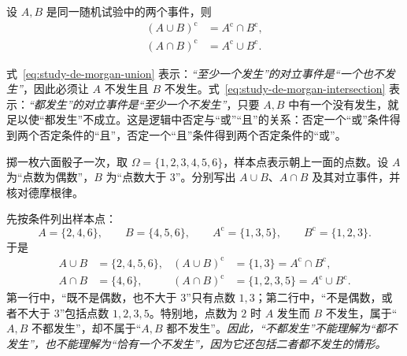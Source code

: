 \documentclass[UTF8,12pt,a4paper,fontset=fandol]{ctexbook}
\begin{document}
\begin{proposition}[两个事件的德摩根律]
\label{prop:study-de-morgan}
设 $A,B$ 是同一随机试验中的两个事件，则
\begin{align}
  (A\cup B)^{\mathrm c}
    &=A^{\mathrm c}\cap B^{\mathrm c},
    \label{eq:study-de-morgan-union}\\
  (A\cap B)^{\mathrm c}
    &=A^{\mathrm c}\cup B^{\mathrm c}.
    \label{eq:study-de-morgan-intersection}
\end{align}
\end{proposition}

式~\eqref{eq:study-de-morgan-union} 表示：\emph{“至少一个发生”的对立事件是“一个也不发生”}，因此必须让 $A$ 不发生且 $B$ 不发生。式~\eqref{eq:study-de-morgan-intersection} 表示：\emph{“都发生”的对立事件是“至少一个不发生”}，只要 $A,B$ 中有一个没有发生，就足以使“都发生”不成立。这是逻辑中否定与“或”“且”的关系：否定一个“或”条件得到两个否定条件的“且”，否定一个“且”条件得到两个否定条件的“或”。

\begin{example}
\label{ex:study-de-morgan-die}
掷一枚六面骰子一次，取 $\Omega=\{1,2,3,4,5,6\}$，样本点表示朝上一面的点数。设 $A$ 为“点数为偶数”，$B$ 为“点数大于 $3$”。分别写出 $A\cup B$、$A\cap B$ 及其对立事件，并核对德摩根律。
\end{example}

\begin{solve}
先按条件列出样本点：
\[
  A=\{2,4,6\},\qquad B=\{4,5,6\},\qquad
  A^{\mathrm c}=\{1,3,5\},\qquad B^{\mathrm c}=\{1,2,3\}.
\]
于是
\[
  \begin{aligned}
    A\cup B&=\{2,4,5,6\},&
    (A\cup B)^{\mathrm c}&=\{1,3\}
      =A^{\mathrm c}\cap B^{\mathrm c},\\
    A\cap B&=\{4,6\},&
    (A\cap B)^{\mathrm c}&=\{1,2,3,5\}
      =A^{\mathrm c}\cup B^{\mathrm c}.
  \end{aligned}
\]
第一行中，“既不是偶数，也不大于 $3$”只有点数 $1,3$；第二行中，“不是偶数，或者不大于 $3$”包括点数 $1,2,3,5$。特别地，点数为 $2$ 时 $A$ 发生而 $B$ 不发生，属于“$A,B$ 不都发生”，却不属于“$A,B$ 都不发生”。\emph{因此，“不都发生”不能理解为“都不发生”，也不能理解为“恰有一个不发生”，因为它还包括二者都不发生的情形。}
\end{solve}
\end{document}
